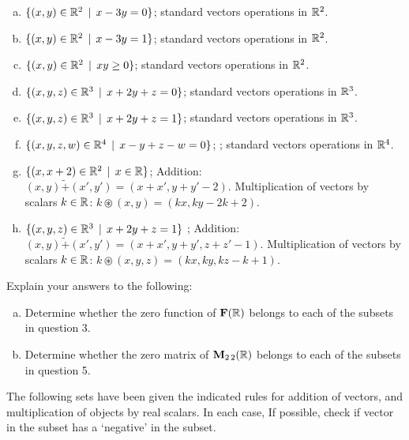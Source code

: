 \begin{prob}
\begin{enumerate}[a)]
\item\sov  $\{(x, y) \in \mathbb{R}^2\,\mid \, x -3y=0  \}$; standard  vectors operations in $\mathbb{R}^2$. \medskip
%

\item $\{(x, y) \in \mathbb{R}^2\,\mid \, x -3y=1  \}$; standard  vectors operations in $\mathbb{R}^2$.\medskip
%

\item\sov  $\{(x, y) \in \mathbb{R}^2\,\mid \, xy \ge 0  \}$;  standard  vectors operations in $\mathbb{R}^2$.\medskip
%
 
\item  $\{(x, y, z) \in \mathbb{R}^3\,\mid \, x+2y+z=0  \}$; standard  vectors operations in $\mathbb{R}^3$.\medskip \medskip
% 
\item\sov  $\{(x, y, z) \in \mathbb{R}^3\,\mid \, x+2y+z=1  \}$; standard  vectors operations in $\mathbb{R}^3$.\medskip  
%
\item  $\{(x, y, z, w) \in \mathbb{R}^4\,\mid \, x-y+z-w=0  \}$; ; standard  vectors operations in $\mathbb{R}^4$.\medskip 
%
\item\sov  $\{(x, x+2) \in \mathbb{R}^2\,\mid \, x\in \mathbb{R} \}$;  Addition: $(x,y) \tilde+ (x',y')=(x+x', y+y' -2)$. Multiplication of vectors  by  scalars $k\in \mathbb{R}$: $k\circledast (x,y)=(kx, ky-2k+2)$.     \medskip
%
\item  $\{(x, y, z) \in \mathbb{R}^3\,\mid \, x+2y+z=1  \}$ ;  Addition: $(x,y) \tilde+ (x',y')=(x+x', y+y',z+z'-1)$. Multiplication of vectors  by  scalars $k\in \mathbb{R}$: $k\circledast (x,y,z)=(kx, ky, kz-k+1)$. \medskip 
%
\end{enumerate}
 
\end{prob} \begin{prob} \label{prob04.8} Explain your answers to the following:

\begin{enumerate}[a)] 

\item\sov  Determine whether the  zero function  of $\mathbf{F}(\mathbb{R})$ belongs to each of the subsets in  question 3. \medskip 
% 
 
\item  Determine whether the  zero matrix of $\mathbf{M}_{2 \,2}(\mathbb{R})$  belongs to each of the subsets in  question 5. \medskip 
%
   
\end{enumerate}  


\end{prob} \begin{prob} \label{prob04.9}  The following sets have been given the indicated rules for addition of vectors,  and multiplication of objects  by real scalars. In each case, If possible, check if vector in the subset has a `negative' in the subset.  


\end{prob}
